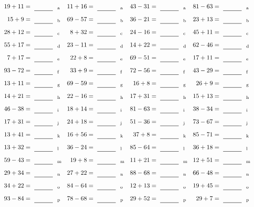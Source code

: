 \documentclass
[
  draft    = true,
  fontsize = 11pt,
  parskip  = half-
]
{scrartcl}
\begin{document}
\clearpage
\begin{align*}
    \pline{19+11}&=\rline{a}
  & \pline{11+16}&=\rline{a}
  & \pline{43-31}&=\rline{a}
  & \pline{81-63}&=\rline{a} \\[1ex]
    \pline{15+9}&=\rline{b}
  & \pline{69-57}&=\rline{b}
  & \pline{36-21}&=\rline{b}
  & \pline{23+13}&=\rline{b} \\[1ex]
    \pline{28+12}&=\rline{c}
  & \pline{8+32}&=\rline{c}
  & \pline{24-16}&=\rline{c}
  & \pline{45+11}&=\rline{c} \\[1ex]
    \pline{55+17}&=\rline{d}
  & \pline{23-11}&=\rline{d}
  & \pline{14+22}&=\rline{d}
  & \pline{62-46}&=\rline{d} \\[1ex]
    \pline{7+17}&=\rline{e}
  & \pline{22+8}&=\rline{e}
  & \pline{69-51}&=\rline{e}
  & \pline{17+11}&=\rline{e} \\[1ex]
    \pline{93-72}&=\rline{f}
  & \pline{33+9}&=\rline{f}
  & \pline{72-56}&=\rline{f}
  & \pline{43-29}&=\rline{f} \\[1ex]
    \pline{13+11}&=\rline{g}
  & \pline{69-59}&=\rline{g}
  & \pline{16+8}&=\rline{g}
  & \pline{26+9}&=\rline{g} \\[1ex]
    \pline{14+21}&=\rline{h}
  & \pline{22-16}&=\rline{h}
  & \pline{17+31}&=\rline{h}
  & \pline{15+13}&=\rline{h} \\[1ex]
    \pline{46-38}&=\rline{i}
  & \pline{18+14}&=\rline{i}
  & \pline{81-63}&=\rline{i}
  & \pline{38-34}&=\rline{i} \\[1ex]
    \pline{17+31}&=\rline{j}
  & \pline{24+18}&=\rline{j}
  & \pline{51-36}&=\rline{j}
  & \pline{73-67}&=\rline{j} \\[1ex]
    \pline{13+41}&=\rline{k}
  & \pline{16+56}&=\rline{k}
  & \pline{37+8}&=\rline{k}
  & \pline{85-71}&=\rline{k} \\[1ex]
    \pline{13+32}&=\rline{l}
  & \pline{36-24}&=\rline{l}
  & \pline{85-64}&=\rline{l}
  & \pline{36+18}&=\rline{l} \\[1ex]
    \pline{59-43}&=\rline{m}
  & \pline{19+8}&=\rline{m}
  & \pline{11+21}&=\rline{m}
  & \pline{12+51}&=\rline{m} \\[1ex]
    \pline{29+34}&=\rline{n}
  & \pline{27+22}&=\rline{n}
  & \pline{88-68}&=\rline{n}
  & \pline{66-48}&=\rline{n} \\[1ex]
    \pline{34+22}&=\rline{o}
  & \pline{84-64}&=\rline{o}
  & \pline{12+13}&=\rline{o}
  & \pline{19+45}&=\rline{o} \\[1ex]
    \pline{93-84}&=\rline{p}
  & \pline{78-68}&=\rline{p}
  & \pline{29+52}&=\rline{p}
  & \pline{29+7}&=\rline{p}
\end{align*}
\end{document}
